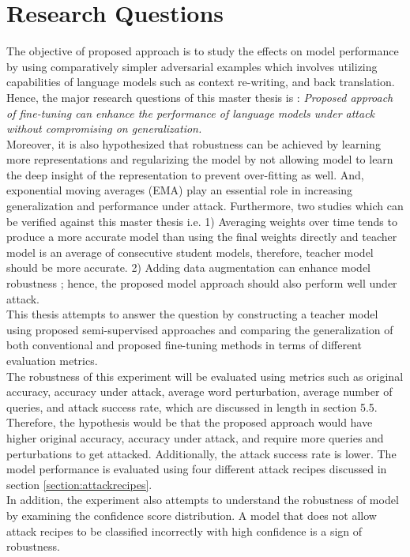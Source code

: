 \documentclass[%
	BCOR=8mm, %
	DIV=12,
	toc=bibliography, %
	toc=listof, %
	oneside, %
	egregdoesnotlikesansseriftitles, %
	]{scrbook}
\begin{document}
\section{Research Questions}
\label{section:researchquestions}
The objective of proposed approach is to study the effects on model performance by using comparatively simpler adversarial examples which involves utilizing capabilities of language models such as context re-writing, and back translation. Hence, the major research questions of this master thesis is : \textit{Proposed approach of fine-tuning can enhance the performance of language models under attack without compromising on generalization.} \\
Moreover, it is  also hypothesized that robustness can be achieved by learning more representations and regularizing the model by not allowing model to learn the deep insight of the representation to prevent over-fitting as well. And, exponential moving averages (EMA) play an essential role in increasing generalization and performance under attack.  Furthermore, two studies which can be verified against this master thesis i.e. 1) Averaging weights over time tends to produce a more accurate model than using the final weights directly \cite{polyak_acceleration_1992} and teacher model is an average of consecutive student models, therefore, teacher model should be more accurate. 2) Adding data augmentation can enhance model robustness \cite{belinkov_synthetic_2018}; hence, the proposed model approach should also perform well under attack.\\
This thesis attempts to answer the question by constructing a teacher model using proposed semi-supervised approaches and comparing the generalization of both conventional and proposed fine-tuning methods in terms of different evaluation metrics. \\
The robustness of this experiment will be evaluated using metrics such as original accuracy, accuracy under attack, average word perturbation, average number of queries, and attack success rate, which are discussed in length in section 5.5. Therefore, the hypothesis would be that the proposed approach would have higher original accuracy, accuracy under attack, and require more queries and perturbations to get attacked. Additionally, the attack success rate is lower. The model performance is evaluated using four different attack recipes discussed in section \ref{section:attackrecipes}. \\
In addition, the experiment also attempts to understand the robustness of model by examining the confidence score distribution. A model that does not allow attack recipes to be classified incorrectly with high confidence is a sign of robustness.
\end{document}
